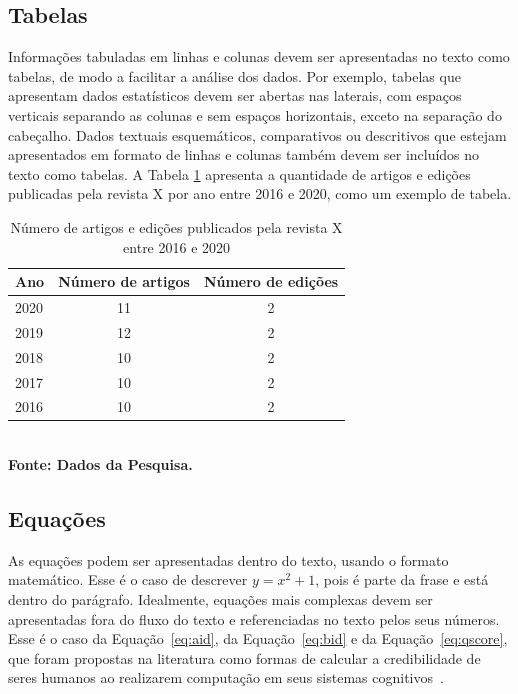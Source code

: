 \documentclass[a4paper,12pt]{article}
\begin{document}
	
	
	\subsection{Tabelas}
	
	Informações tabuladas em linhas e colunas devem ser apresentadas no texto como tabelas, de modo a facilitar a análise dos dados. Por exemplo, tabelas que apresentam dados estatísticos devem ser abertas nas laterais, com espaços verticais separando as colunas e sem espaços horizontais, exceto na separação do cabeçalho. Dados textuais esquemáticos, comparativos ou descritivos que estejam apresentados em formato de linhas e colunas também devem ser incluídos no texto como tabelas. A Tabela \ref{tab:tabela1} apresenta a quantidade de artigos e edições publicadas pela revista X por ano entre 2016 e 2020, como um exemplo de tabela.
	
	\begin{table}[ht]
		\centering
		\caption{Número de artigos e edições publicados pela revista X entre 2016 e 2020}
		\label{tab:tabela1}
		\begin{tabular}{l|c|c}
			\hline
			\textbf{Ano}	& \textbf{Número de artigos} & \textbf{Número de edições} \\
			\hline
			2020	& 11 &  2 \\
			2019	& 12 &  2 \\
			2018	& 10 &  2 \\
			2017   & 10  &  2 \\
			2016	& 10  &  2 \\
			\hline
		\end{tabular}
		{\footnotesize\\ \textbf{Fonte: Dados da Pesquisa.}}
	\end{table}
	
	
	\subsection{\esp Equações}
	
	As equações podem ser apresentadas dentro do texto, usando o formato matemático. Esse é o caso de descrever $y=x^2+1$, pois é parte da frase e está dentro do parágrafo. Idealmente, equações mais complexas devem ser apresentadas fora do fluxo do texto e referenciadas no texto pelos seus números. Esse é o caso da Equação~\ref{eq:aid}, da Equação~\ref{eq:bid} e da Equação~\ref{eq:qscore}, que foram propostas na literatura como formas de calcular a credibilidade de seres humanos ao realizarem computação em seus sistemas cognitivos~\cite{ponciano2018agreement}. 
	
\end{document}
